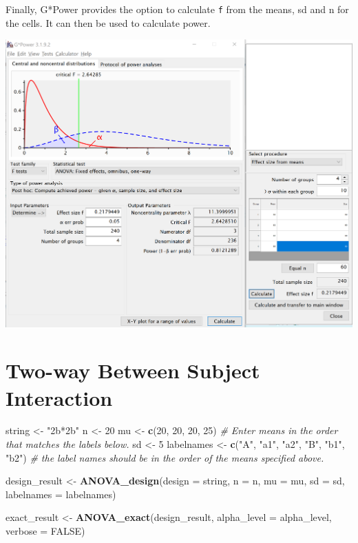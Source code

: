\documentclass[]{book}
\newenvironment{Shaded}{\begin{snugshade}}{\end{snugshade}}
\newcommand{\CommentTok}[1]{\textcolor[rgb]{0.56,0.35,0.01}{\textit{#1}}}
\newcommand{\DataTypeTok}[1]{\textcolor[rgb]{0.13,0.29,0.53}{#1}}
\newcommand{\DecValTok}[1]{\textcolor[rgb]{0.00,0.00,0.81}{#1}}
\newcommand{\KeywordTok}[1]{\textcolor[rgb]{0.13,0.29,0.53}{\textbf{#1}}}
\newcommand{\NormalTok}[1]{#1}
\newcommand{\OtherTok}[1]{\textcolor[rgb]{0.56,0.35,0.01}{#1}}
\newcommand{\StringTok}[1]{\textcolor[rgb]{0.31,0.60,0.02}{#1}}
\begin{document}
Finally, G*Power \citep{faul2007g} provides the option to calculate \texttt{f} from the means, sd and n for the cells. It can then be used to calculate power.

\includegraphics{screenshots/gpower_13.png}

\hypertarget{two-way-between-subject-interaction}{%
\section{Two-way Between Subject Interaction}\label{two-way-between-subject-interaction}}

\begin{Shaded}
\begin{Highlighting}[]
\NormalTok{string <-}\StringTok{ "2b*2b"}
\NormalTok{n <-}\StringTok{ }\DecValTok{20}
\NormalTok{mu <-}\StringTok{ }\KeywordTok{c}\NormalTok{(}\DecValTok{20}\NormalTok{, }\DecValTok{20}\NormalTok{, }\DecValTok{20}\NormalTok{, }\DecValTok{25}\NormalTok{) }
\CommentTok{# Enter means in the order that matches the labels below.}
\NormalTok{sd <-}\StringTok{ }\DecValTok{5}
\NormalTok{labelnames <-}\StringTok{ }\KeywordTok{c}\NormalTok{(}\StringTok{"A"}\NormalTok{, }\StringTok{"a1"}\NormalTok{, }\StringTok{"a2"}\NormalTok{, }\StringTok{"B"}\NormalTok{, }\StringTok{"b1"}\NormalTok{, }\StringTok{"b2"}\NormalTok{) }
\CommentTok{# the label names should be in the order of the means specified above.}

\NormalTok{design_result <-}\StringTok{ }\KeywordTok{ANOVA_design}\NormalTok{(}\DataTypeTok{design =}\NormalTok{ string,}
                   \DataTypeTok{n =}\NormalTok{ n, }
                   \DataTypeTok{mu =}\NormalTok{ mu, }
                   \DataTypeTok{sd =}\NormalTok{ sd, }
                   \DataTypeTok{labelnames =}\NormalTok{ labelnames)}



\NormalTok{exact_result <-}\StringTok{ }\KeywordTok{ANOVA_exact}\NormalTok{(design_result,}
                            \DataTypeTok{alpha_level =}\NormalTok{ alpha_level,}
                            \DataTypeTok{verbose =} \OtherTok{FALSE}\NormalTok{)}
\end{Highlighting}
\end{Shaded}
\end{document}
